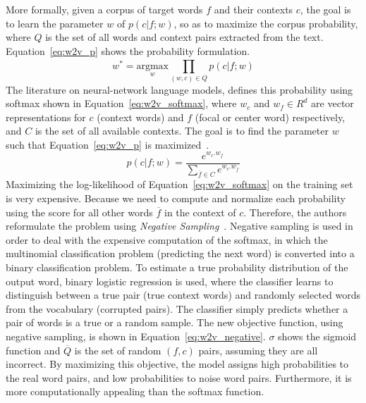 More formally, given a corpus of target words $f$ and their contexts $c$, the goal is to learn the parameter $w$ of $p(c|f; w)$, so as to maximize the corpus probability, where $Q$ is the set of all words and context pairs extracted from the text. Equation~\ref{eq:w2v_p} shows the probability formulation.
\begin{equation}
\label{eq:w2v_p}
w^*=\underset { w  }{ { \text{argmax} } } \prod _{ (w,c)\in Q }^{  }{ p(c|f;  w )}
\end{equation}
The literature on neural-network language models, defines this probability using softmax shown in Equation~\ref{eq:w2v_softmax}, where $w_c$ and $ w_f\in R^d$ are vector representations for $c$ (context words) and $f$ (focal or center word) respectively, and
$C$ is the set of all available contexts. The goal is to find the parameter $w$ such that Equation~\ref{eq:w2v_p} is maximized~. 
\begin{equation}
\label{eq:w2v_softmax}
p(c|f;w)=\frac { { e }^{ w_{ c }.w_{ f } } }{ \sum _{ \overline { f } \in C }^{  }{ { e }^{ w_{ c }.w_{ \overline { f }  } } }  } 
\end{equation}
Maximizing the log-likelihood of Equation~\ref{eq:w2v_softmax} on the training set is very expensive. Because we need to compute and normalize each probability using the score for all other words  $\overline { f }$ in the context of $c$. Therefore, the authors reformulate the problem using \emph{Negative Sampling}~. Negative sampling is used in order to deal with the expensive computation of the softmax, in which the multinomial classification problem (predicting the next word) is converted into a binary classification problem. To estimate a true probability distribution of the output word, binary logistic regression is used, where the classifier learns to distinguish between a true pair (true context words) and randomly selected words from the vocabulary (corrupted pairs). The classifier simply predicts whether a pair of words is a true or a random sample. The new objective function, using negative sampling, is shown in Equation~\ref{eq:w2v_negative}. $ \sigma$ shows the sigmoid function and $\overline{Q}$ is the set of random $(f, c)$ pairs, assuming they are all incorrect. By maximizing this objective, the model assigns high probabilities to the real word pairs, and low probabilities to noise word pairs. Furthermore, it is more computationally appealing than the softmax function.

